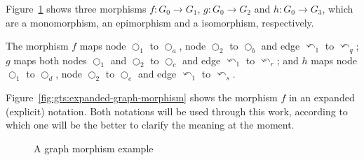 \begin{example}Figure~\ref{fig:gts:compact-graph-morphism} shows three morphisms $f : G_0 \rightarrow G_1$, $g : G_0 \rightarrow G_2$ and $h : G_0 \rightarrow G_3$, which are a monomorphism, an epimorphism and a isomorphism, respectively.

  The morphism $f$ maps node $\Circle_1$ to $\Circle_a$, node $\Circle_2$ to $\Circle_b$ and edge $\curvearrowleft_1$ to $\curvearrowleft_q$; $g$ maps both nodes $\Circle_1$ and $\Circle_2$ to $\Circle_c$ and edge $\curvearrowleft_1$ to $\curvearrowleft_r$; and $h$ maps node $\Circle_1$ to $\Circle_d$, node $\Circle_2$ to $\Circle_e$ and edge $\curvearrowleft_1$ to $\curvearrowleft_s$.

  Figure~\ref{fig:gts:expanded-graph-morphism} shows the morphism $f$ in an expanded (explicit) notation. Both notations will be used through this work, according to which one will be the better to clarify the meaning at the moment.
\begin{figure}[!ht]
  \centering
  \caption{A graph morphism example}\label{fig:gts:compact-graph-morphism}
\end{figure}


\end{example}
